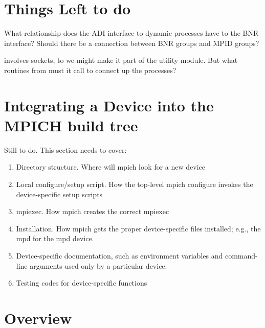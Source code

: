 \documentclass{article}
\begin{document}
\section{Things Left to do}
What relationship does the ADI interface to dynamic processes 
have to the BNR interface?  Should there be a connection between BNR groups
and MPID groups?


 involves sockets, to we might make it part of the
utility module.  But what routines from  must it call
to connect up the processes?


%

%


\section{Integrating a Device into the MPICH build tree}
Still to do.  This section needs to cover:
\begin{enumerate}
\item Directory structure.  Where will mpich look for a new device
\item Local configure/setup script.  How the top-level mpich configure invokes
  the device-specific setup scripts
\item mpiexec.  How mpich creates the correct mpiexec
\item Installation.  How mpich gets the proper device-specific files
  installed; e.g., the mpd for the mpd device.
\item Device-specific documentation, such as environment variables and
  command-line arguments used only by a particular device.
\item Testing codes for device-specific functions
\end{enumerate}

\mancontentstrue

\section{Overview}


\end{document}
